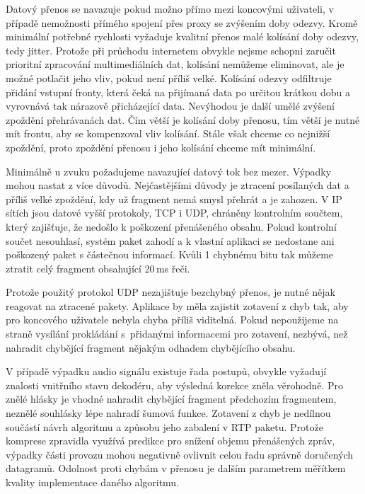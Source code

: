 Datový přenos se navazuje pokud možno přímo mezi koncovými uživateli, 
v případě nemožnosti přímého spojení přes proxy se zvýšením doby odezvy.
Kromě minimální potřebné rychlosti vyžaduje kvalitní přenos malé
 kolísání doby odezvy, tedy jitter. Protože při průchodu internetem obvykle
 nejsme schopni zaručit prioritní zpracování multimediálních dat, kolísání
 nemůžeme eliminovat, ale je možné potlačit jeho vliv, pokud není příliš velké. Kolísání odezvy odfiltruje přidání vstupní fronty, která čeká na přijímaná data po určitou krátkou dobu a vyrovnává tak nárazově přicházející
 data. Nevýhodou je další umělé zvýšení zpoždění přehrávanách dat. Čím větší
je kolísání doby přenosu, tím větší je nutné mít frontu, aby se kompenzoval vliv kolísání. Stále však chceme co nejnižší zpoždění, proto zpoždění 
přenosu i jeho kolísání chceme mít minimální.

Minimálně u zvuku požadujeme navazující datový tok bez mezer\cite{RtpBook}. 
Výpadky mohou nastat z více důvodů. Nejčastějšími důvody je ztracení posílaných dat a příliš velké zpoždění, kdy už fragment nemá smysl přehrát a je zahozen. V IP sítích jsou datové vyšší protokoly, TCP i UDP, chráněny 
kontrolním součtem, který zajišťuje, že nedošlo k poškození přenášeného obsahu. Pokud kontrolní součet nesouhlasí, systém paket zahodí a k vlastní
aplikaci se nedostane ani poškozený paket s částečnou informací. Kvůli 
1 chybnému bitu tak můžeme ztratit celý fragment obsahující 20\,ms řeči.

Protože použitý protokol UDP nezajištuje bezchybný přenos, je nutné nějak
reagovat na ztracené pakety. Aplikace by měla zajistit zotavení z chyb tak,
aby pro koncového uživatele nebyla chyba příliš viditelná. Pokud nepoužijeme 
na straně vysílání prokládání s~přidanými informacemi pro zotavení, nezbývá,
než nahradit chybějící fragment nějakým odhadem chybějícího obsahu. 

V případě výpadku audio signálu existuje řada postupů, obvykle vyžadují 
znalosti vnitřního stavu dekodéru, aby výsledná korekce zněla věrohodně.
Pro znělé hlásky je vhodné nahradit chybějící fragment předchozím fragmentem,
neznělé souhlásky lépe nahradí šumová funkce\cite{RtpBook}. Zotavení z chyb je nedílnou součástí návrh algoritmu a způsobu jeho zabalení v RTP paketu.
Protože komprese zpravidla využívá predikce pro snížení objemu přenášených
zpráv, výpadky části provozu mohou negativně ovlivnit celou řadu správně
doručených datagramů. Odolnost proti chybám v přenosu je dalším parametrem
měřítkem kvality implementace daného algoritmu.
